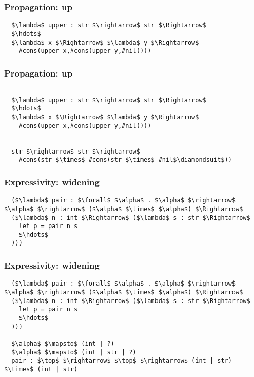 \documentclass{beamer}
\begin{document}
\begin{frame}[fragile]
  \frametitle{Propagation: up}

  \begin{lstlisting}
  $\lambda$ upper : str $\rightarrow$ str $\Rightarrow$
  $\hdots$
  $\lambda$ x $\Rightarrow$ $\lambda$ y $\Rightarrow$
    #cons(upper x,#cons(upper y,#nil()))
  \end{lstlisting}

\end{frame}

\begin{frame}[fragile]
  \frametitle{Propagation: up}

  \begin{lstlisting}

  $\lambda$ upper : str $\rightarrow$ str $\Rightarrow$
  $\hdots$
  $\lambda$ x $\Rightarrow$ $\lambda$ y $\Rightarrow$
    #cons(upper x,#cons(upper y,#nil()))


  str $\rightarrow$ str $\rightarrow$
    #cons(str $\times$ #cons(str $\times$ #nil$\diamondsuit$))
  \end{lstlisting}

\end{frame}

\begin{frame}[fragile]
  \frametitle{Expressivity: widening}

  \begin{lstlisting}
  ($\lambda$ pair : $\forall$ $\alpha$ . $\alpha$ $\rightarrow$ $\alpha$ $\rightarrow$ ($\alpha$ $\times$ $\alpha$) $\Rightarrow$ 
  ($\lambda$ n : int $\Rightarrow$ ($\lambda$ s : str $\Rightarrow$ 
    let p = pair n s
    $\hdots$
  )))

  \end{lstlisting}
\end{frame}


\begin{frame}[fragile]
  \frametitle{Expressivity: widening}

  \begin{lstlisting}
  ($\lambda$ pair : $\forall$ $\alpha$ . $\alpha$ $\rightarrow$ $\alpha$ $\rightarrow$ ($\alpha$ $\times$ $\alpha$) $\Rightarrow$ 
  ($\lambda$ n : int $\Rightarrow$ ($\lambda$ s : str $\Rightarrow$ 
    let p = pair n s
    $\hdots$
  )))

  $\alpha$ $\mapsto$ (int | ?) 
  $\alpha$ $\mapsto$ (int | str | ?)
  pair : $\top$ $\rightarrow$ $\top$ $\rightarrow$ (int | str) $\times$ (int | str)

  \end{lstlisting}
\end{frame}
\end{document}
